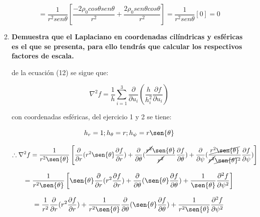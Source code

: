\documentclass[12pt,a4paper]{article}
\begin{document}
\begin{enumerate}
    \begin{equation*}
        = \frac{1}{r^2 sen \theta} \left[\frac{-2\rho _0cos \theta sen \theta}{r^2} + \frac{2 \rho _0 sen \theta cos \theta}{r^2} \right] = \frac{1}{r^2 sen \theta} [0] = 0
    \end{equation*}
    
    \item \textbf{Demuestra que el Laplaciano en coordenadas cilíndricas y esféricas es el
    que se presenta, para ello tendrás que calcular los respectivos factores
    de escala.}
    
    de la ecuación (12) se sigue que:
    
    \begin{equation*}
        \nabla ^2 f = \frac{1}{h} \sum_{i=1}^{3} \frac{\partial}{\partial u_i}(\frac{h}{h_i^2} \frac{\partial f}{\partial u_i})
    \end{equation*}
    
    con coordenadas esféricas, del ejercicio 1 y 2 se tiene:
    
    \begin{equation*}
        h_r = 1 ; h_\theta = r ; h_\psi = r \sen{\theta}
    \end{equation*}
    
    \begin{equation*}
        \therefore \nabla ^2 f = \frac{1}{r^2 \sen{\theta}} \left[\frac{\partial}{\partial r}(r^2 \sen{\theta}\frac{\partial f}{\partial r}) + \frac{\partial}{\partial \theta}(\frac{\cancel{r^2}\sen{\theta}}{\cancel{r^2}}\frac{\partial f}{\partial \theta}) + \frac{\partial}{\partial \psi}( \frac{\cancel{r^2 \sen{\theta}}}{\cancel{r^2}\cancel{\sen{\theta}}^2} \frac{\partial f}{\partial \psi}) \right]
    \end{equation*}
    
    \begin{equation*}
        = \frac{1}{r^2 \sen{\theta}} \left[\sen{\theta} \frac{\partial}{\partial r}(r^2 \frac{\partial f}{\partial r}) + \frac{\partial}{\partial \theta}(\sen{\theta}\frac{\partial f}{\partial \theta}) +  \frac{1}{\sen{\theta}}\frac{\partial^2 f}{\partial \psi ^2} \right]
    \end{equation*}
    
    \begin{equation*}
        = \frac{1}{r^2} \frac{\partial}{\partial r}(r^2 \frac{\partial f}{\partial r}) + \frac{1}{r^2 \sen{\theta}} \frac{\partial}{\partial \theta}(\sen{\theta} \frac{\partial f}{\partial \theta}) + \frac{1}{r^2 \sen{\theta}} \frac{\partial ^2 f}{\partial \psi ^2}
    \end{equation*}
    

\end{enumerate}
\end{document}

